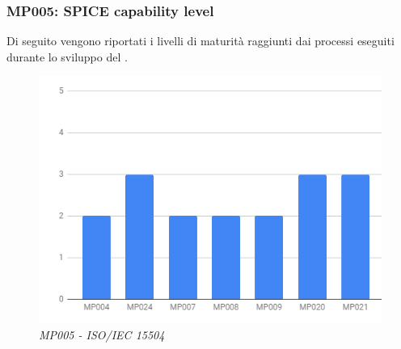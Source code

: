 \subsubsection{MP005: SPICE capability level}
Di seguito vengono riportati i livelli di maturità raggiunti dai processi eseguiti durante lo sviluppo del .
\begin{figure} [h]
    \centering
	\includegraphics[scale=0.7]{./images/15504.PNG}
    \caption{\textit{MP005 - ISO/IEC 15504 }}\label{}
\end{figure}
